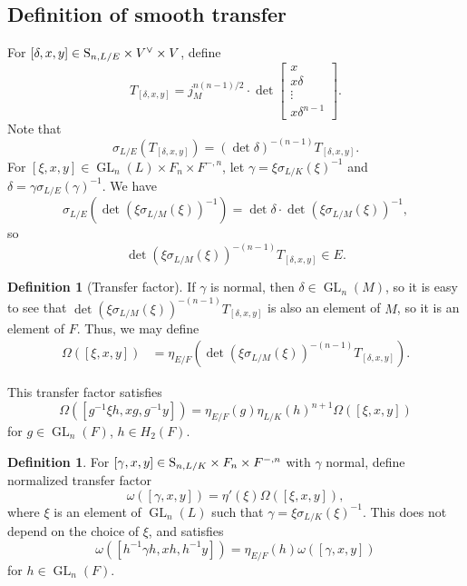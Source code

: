 \documentclass[11pt, reqno]{amsart}
\numberwithin{equation}{subsection}
\theoremstyle{plain}
\theoremstyle{definition}
\newtheorem{definition}[proposition]{Definition}
\renewcommand{\S}{\textnormal{S}}
\DeclareMathOperator{\GL}{GL}
\begin{document}
\subsection{Definition of smooth transfer} 
For $[\delta, x, y] \in \S_{n, L/E} \times V^\vee \times V$,
define
\[
    T_{[\delta, x, y]} 
    = j_M^{n(n-1)/2} \cdot \det \begin{bmatrix}
        x \\ x\delta \\ \vdots \\ x\delta^{n-1}
    \end{bmatrix}.
\]
Note that
\[
    \sigma_{L/E}(T_{[\delta, x, y]})
    = (\det \delta)^{-(n-1)} T_{[\delta, x, y]}.
\]
For $[\xi, x, y] \in \GL_n(L) \times F_n \times F^{-,n}$,
let $\gamma = \xi\sigma_{L/K}(\xi)^{-1}$
and $\delta = \gamma\sigma_{L/E}(\gamma)^{-1}$.
We have
\[
    \sigma_{L/E}(\det(\xi\sigma_{L/M}(\xi))^{-1}) = \det \delta\cdot \det(\xi\sigma_{L/M}(\xi))^{-1},
\]
so
\[
    \det(\xi\sigma_{L/M}(\xi))^{-(n-1)}T_{[\delta, x, y]}
    \in E.
\]
\begin{definition}[Transfer factor]
If $\gamma$ is normal, then $\delta \in \GL_n(M)$,
so it is easy to see that $\det(\xi\sigma_{L/M}(\xi))^{-(n-1)}T_{[\delta, x, y]}$
is also an element of $M$, so it is an element of $F$.
Thus, we may define
\begin{align*}
    \Omega([\xi, x, y]) &= \eta_{E/F}(\det(\xi\sigma_{L/M}(\xi))^{-(n-1)} 
    T_{[\delta, x, y]}).
\end{align*}    
\end{definition}


This transfer factor satisfies 
\begin{equation}
\label{eq:Omegainvariance}
    \Omega([g^{-1}\xi h, xg, g^{-1}y]) 
    = \eta_{E/F}(g)\eta_{L/K}(h)^{n+1} \Omega([\xi, x, y])
\end{equation}
for $g \in \GL_n(F)$, $h \in H_2(F)$.

\begin{definition}
For $[\gamma, x, y] \in \S_{n,L/K} \times F_n
\times F^{-,n}$ with $\gamma$ normal, define normalized transfer factor
\[
    \omega([\gamma, x, y]) =
    \eta'(\xi)\Omega([\xi, x, y]),
\]
where $\xi$ is an element of $\GL_n(L)$ such
that $\gamma = \xi\sigma_{L/K}(\xi)^{-1}$.
This does not depend on the choice of $\xi$, and
satisfies
\[
    \omega([h^{-1}\gamma h, xh, h^{-1}y])
    = \eta_{E/F}(h)\omega([\gamma, x, y])
\]
for $h \in \GL_n(F)$.
\end{definition}
\end{document}
